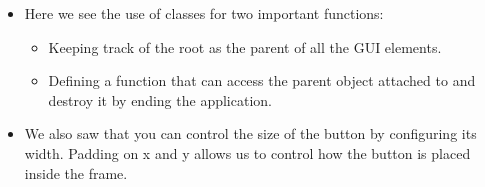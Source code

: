 \documentclass[letterpaper,10pt,english]{sphinxmanual}
\begin{document}
\begin{itemize}
\item {} 
Here we see the use of classes for two important functions:
\begin{itemize}
\item {} 
Keeping track of the root as the parent of all the GUI elements.

\item {} 
Defining a function that can access the parent object attached to  and destroy
it by ending the application.

\end{itemize}

\item {} 
We also saw that you can control the size of the button by configuring its width. Padding
on x and y allows us to control how the button is placed inside the frame.

\end{itemize}
\end{document}
